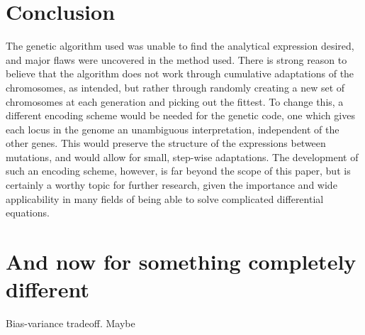 \documentclass[multicolumn, 9pt]{extarticle}
\begin{document}
\section{Conclusion}

The genetic algorithm used was unable to find the analytical expression desired, and major flaws were uncovered in the method used. There is strong reason to believe that the algorithm does not work through cumulative adaptations of the chromosomes, as intended, but rather through randomly creating a new set of chromosomes at each generation and picking out the fittest. To change this, a different encoding scheme would be needed for the genetic code, one which gives each locus in the genome an unambiguous interpretation, independent of the other genes. This would preserve the structure of the expressions between mutations, and would allow for small, step-wise adaptations. The development of such an encoding scheme, however, is far beyond the scope of this paper, but is certainly a worthy topic for further research, given the importance and wide applicability in many fields of being able to solve complicated differential equations.

\appendix
\section{And now for something completely different}
Bias-variance tradeoff. Maybe




\end{document}
